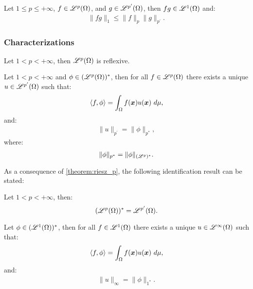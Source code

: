 \begin{theorem}
    Let $1 \leq p \leq +\infty$, $f \in \mathscr{L}^{p}(\Omega)$, and $g \in \mathscr{L}^{p^{\prime}}(\Omega)$, then $fg \in \mathscr{L}^{1}(\Omega)$ and:
    \begin{gather}
        \lVert fg \rVert_1 \leq \lVert f \rVert_p \lVert g \rVert_{p^{\prime}}.
    \end{gather}
\end{theorem}

\subsubsection{Characterizations}

\begin{theorem}
    Let $1 < p < +\infty$, then $\mathscr{L}^{p}(\Omega)$ is reflexive.
\end{theorem}

\begin{theorem} \label{theorem:riesz_p}
    Let $1 < p < +\infty$ and $\phi \in (\mathscr{L}^{p}(\Omega))^*$, then for all $f \in \mathscr{L}^{p}(\Omega)$ there exists a unique $u \in \mathscr{L}^{p^{\prime}}(\Omega)$ such that:
    \begin{gather}
        \langle f, \phi \rangle = \int_{\Omega} f(\bm{x}) u(\bm{x}) ~ d \mu,
    \end{gather}
    and:
    \begin{gather}
        \lVert u \rVert_{p^{\prime}} = \lVert \phi \rVert_{p^*},
    \end{gather}
    where:
    \begin{gather}
        \lVert \phi \rVert_{p^*} = \lVert \phi \rVert_{(\mathscr{L}^{p})^*}.
    \end{gather}
\end{theorem}

As a consequence of \autoref{theorem:riesz_p}, the following identification result can be stated:

\begin{theorem}
    Let $1 < p < +\infty$, then:
    \begin{gather}
        (\mathscr{L}^{p}(\Omega))^* = \mathscr{L}^{p^{\prime}}(\Omega).
    \end{gather}
\end{theorem}

\begin{theorem}[Riesz representation theorem for $p = 1$] \label{theorem:riesz_1}
    Let $\phi \in (\mathscr{L}^{1}(\Omega))^*$, then for all $f \in \mathscr{L}^{1}(\Omega)$ there exists a unique $u \in \mathscr{L}^{\infty}(\Omega)$ such that:
    \begin{gather}
        \langle f, \phi \rangle = \int_{\Omega} f(\bm{x}) u(\bm{x}) ~ d \mu,
    \end{gather}
    and:
    \begin{gather}
        \lVert u \rVert_{\infty} = \lVert \phi \rVert_{1^*}.
    \end{gather}
\end{theorem}

